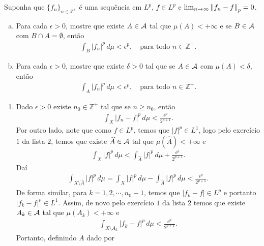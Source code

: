 \begin{homeworkProblem}[4]
  Suponha que $\{f_n\}_{n\in\mathbb{Z}^{+}}$ é uma sequência em $L^{p}$, $f\in L^{p}$ e $\lim_{n \to \infty}\left\|f_n-f\right\|_{p}=0$.
  \begin{enumerate}[a)]
    \item Para cada $\epsilon>0$, mostre que existe $A\in\mathcal{A}$ tal que $\mu(A)<+\infty$ e se $B\in\mathcal{A}$ com $B\cap A=\emptyset$, então
      \begin{align*}
        \int_{B}|f_n|^{p}\,d\mu<\epsilon^{p},\quad\text{para todo }n\in\mathbb{Z}^{+}.
      \end{align*}
    \item Para cada $\epsilon>0$, mostre que existe $\delta>0$ tal que se $A\in\mathcal{A}$ com $\mu(A)<\delta$, então
      \begin{align*}
        \int_{A}|f_n|^{p}\,d\mu<\epsilon^{p},\quad\text{para todo }n\in\mathbb{Z}^{+}.
      \end{align*}
  \end{enumerate}
  \begin{solution}
  \begin{enumerate}
    \item Dado $\epsilon>0$ existe $n_0\in\mathbb{Z}^{+}$ tal que se $n\geq n_0$, então
      \begin{align*}
        \int_{X}|f_n-f|^{p}\,d\mu<\frac{\epsilon^{p}}{2^{p+1}}.
      \end{align*}
      Por outro lado, note que como $f\in L^{p}$, temos que $|f|^{p}\in L^{1}$, logo pelo exercício $1$ da lista $2$, temos que existe $\widehat{A}\in\mathcal{A}$ tal que $\mu(\hat{A})<+\infty$ e
      \begin{align*}
        \int_{X}|f|^{p}\,d\mu< \int_{\hat{A}}|f|^{p}\,d\mu+\frac{\epsilon^{p}}{2^{p+1}}.
      \end{align*}
      Daí
      \begin{align*}
        \int_{X\setminus \hat{A}}|f|^{p}\,d\mu=\int_{X}|f|^{p}\,d\mu-\int_{\hat{A}}|f|^{p}\,d\mu< \frac{\epsilon^{p}}{2^{p+1}}.
      \end{align*}
      De forma similar, para $k=1,2,\cdots,n_0-1$, temos que $|f_k-f|\in L^{p}$ e portanto $|f_k-f|^{p}\in L^{1}$. Assim, de novo pelo exercício $1$ da lista $2$ temos que existe $A_k\in \mathcal{A}$ tal que $\mu(A_k)<+\infty$ e
      \begin{align*}
        \int_{X\setminus A_k}|f_k-f|^{p}\,d\mu < \frac{\epsilon^{p}}{2^{p+1}}. 
      \end{align*}
      Portanto, definindo $A$ dado por

\end{enumerate}
\end{solution}
\end{homeworkProblem}

